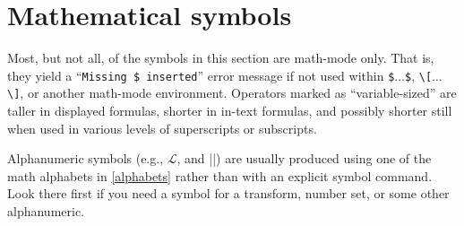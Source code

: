 \section{Mathematical symbols}
\label{math-symbols}


Most, but not all, of the symbols in this section are math-mode only.
That is, they yield a ``\texttt{Missing~\$ inserted}'' error message if not
used within \verb|$|$\ldots$\verb|$|, \verb|\[|$\ldots$\verb|\]|, or
another math-mode environment.  Operators marked as ``variable-sized''
are taller in displayed formulas, shorter in in-text formulas, and
possibly shorter still when used in various levels of superscripts or
subscripts.


\newcommand{\dotcup}{\ensuremath{\mathaccent\cdot\cup}}


Alphanumeric symbols (e.g., $\mathscr{L}$, and
||) are usually produced using one of the math
alphabets in \ref{alphabets} rather than with an explicit symbol
command.  Look there first if you need a symbol for a transform,
number set, or some other alphanumeric.

